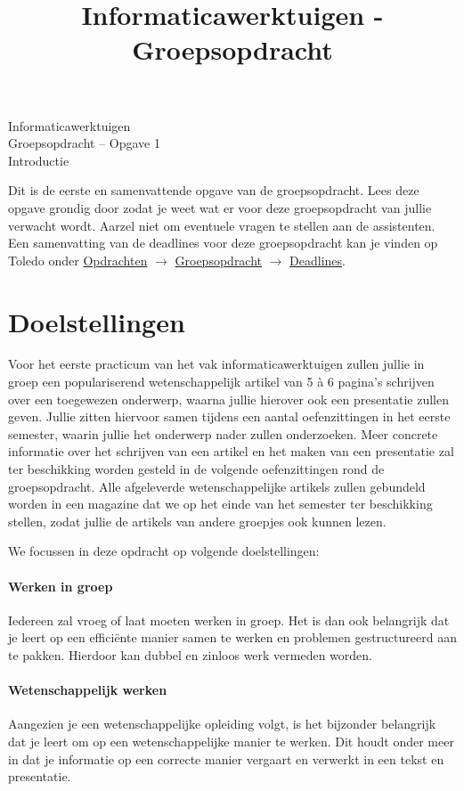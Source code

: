 \documentclass[a4paper]{article}
\title{Informaticawerktuigen - Groepsopdracht}
\begin{document}
\begin{center}
  \huge Informaticawerktuigen \\
  \Huge Groepsopdracht -- Opgave 1 \\
  \huge Introductie
\end{center}
\vspace{1em}

Dit is de eerste en samenvattende opgave van de groepsopdracht.
Lees deze opgave grondig door zodat je weet wat er voor deze groepsopdracht van jullie verwacht wordt.
Aarzel niet om eventuele vragen te stellen aan de assistenten.
Een samenvatting van de deadlines voor deze groepsopdracht kan je vinden op Toledo onder \underline{Opdrachten} $\rightarrow$ \underline{Groepsopdracht} $\rightarrow$ \underline{Deadlines}.


\section{Doelstellingen}

Voor het eerste practicum van het vak informaticawerktuigen zullen jullie in groep een populariserend wetenschappelijk artikel van 5 \`a 6 pagina's schrijven over een toegewezen onderwerp, waarna jullie hierover ook een presentatie zullen geven.
Jullie zitten hiervoor samen tijdens een aantal oefenzittingen in het eerste semester, waarin jullie het onderwerp nader zullen onderzoeken.
Meer concrete informatie over het schrijven van een artikel en het maken van een presentatie zal ter beschikking worden gesteld in de volgende oefenzittingen rond de groepsopdracht.
Alle afgeleverde wetenschappelijke artikels zullen gebundeld worden in een magazine dat we op het einde van het semester ter beschikking stellen, zodat jullie de artikels van andere groepjes ook kunnen lezen.

We focussen in deze opdracht op volgende doelstellingen:

\paragraph{Werken in groep}
Iedereen zal vroeg of laat moeten werken in groep.
Het is dan ook belangrijk dat je leert op een effici\"ente manier samen te werken en problemen gestructureerd aan te pakken.
Hierdoor kan dubbel en zinloos werk vermeden worden.

\paragraph{Wetenschappelijk werken}
Aangezien je een wetenschappelijke opleiding volgt, is het bijzonder belangrijk dat je leert om op een wetenschappelijke manier te werken.
Dit houdt onder meer in dat je informatie op een correcte manier vergaart en verwerkt in een tekst en presentatie.
\end{document}
